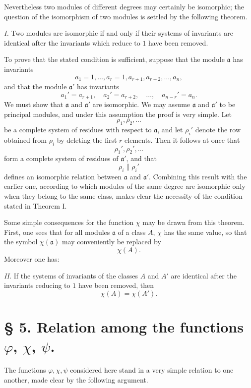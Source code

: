 \documentclass[11pt,a4paper]{article}
\begin{document}
Nevertheless two modules of different degrees may certainly be isomorphic; the question of the isomorphism of two modules is settled by the following theorem.

\emph{I.} Two modules are isomorphic if and only if their systems of invariants are identical after the invariants which reduce to $1$ have been removed.

To prove that the stated condition is sufficient, suppose that the module $\mathfrak a$ has invariants
\[
 a_1=1,\ldots,a_r=1,a_{r+1},a_{r+2},\ldots,a_n,
\]
and that the module $\mathfrak a'$ has invariants
\[
 a_1'=a_{r+1},\quad a_2'=a_{r+2},\quad\ldots,\quad a_{n-r}'=a_n.
\]
We must show that $\mathfrak a$ and $\mathfrak a'$ are isomorphic. We may assume $\mathfrak a$ and $\mathfrak a'$ to be principal modules, and under this assumption the proof is very simple. Let
\[
 \rho_1,\rho_2,\ldots
\]
be a complete system of residues with respect to $\mathfrak a$, and let $\rho_i'$ denote the row obtained from $\rho_i$ by deleting the first $r$ elements. Then it follows at once that
\[
 \rho_1',\rho_2',\ldots
\]
form a complete system of residues of $\mathfrak a'$, and that
\[
 \rho_i\parallel\rho_i'
\]
defines an isomorphic relation between $\mathfrak a$ and $\mathfrak a'$. Combining this result with the earlier one, according to which modules of the same degree are isomorphic only when they belong to the same class, makes clear the necessity of the condition stated in Theorem I.

Some simple consequences for the function $\chi$ may be drawn from this theorem. First, one sees that for all modules $\mathfrak a$ of a class $A$, $\chi$ has the same value, so that the symbol $\chi(\mathfrak a)$ may conveniently be replaced by
\[
 \chi(A).
\]
Moreover one has:

\emph{II.} If the systems of invariants of the classes $A$ and $A'$ are identical after the invariants reducing to $1$ have been removed, then
\[
 \chi(A)=\chi(A').
\]

\section*{§ 5. Relation among the functions $\varphi$, $\chi$, $\psi$.}

The functions $\varphi,\chi,\psi$ considered here stand in a very simple relation to one another, made clear by the following argument.
\end{document}
